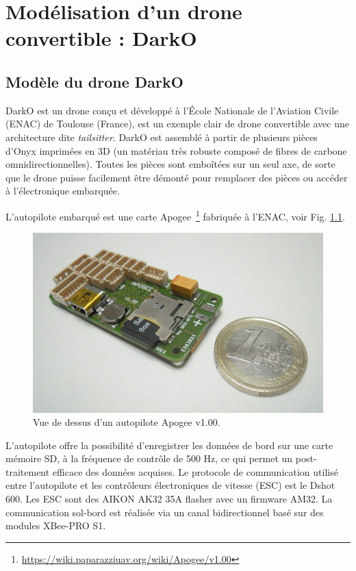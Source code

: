 \chapter{Modélisation d'un drone convertible : DarkO}
\minitoc
\label{chap:model}

\section{Modèle du drone DarkO}
\label{sec:model}
DarkO est un drone conçu et développé à l'École Nationale de l'Aviation Civile (ENAC) de Toulouse (France), est un exemple clair de drone convertible avec une architecture dite \textit{tailsitter}.
DarkO est assemblé à partir de plusieurs pièces d'Onyx imprimées en 3D (un matériau très robuste composé de fibres de carbone omnidirectionnelles). Toutes les pièces sont emboîtées sur un seul axe, de sorte que le drone puisse facilement être démonté pour remplacer des pièces ou accéder à l'électronique embarquée. 

L'autopilote embarqué est une carte Apogee~\footnote{\url{https://wiki.paparazziuav.org/wiki/Apogee/v1.00}} fabriquée à l'ENAC, voir Fig. \ref{fig:apogee}. 


\begin{figure}[ht]
    \centering
        \includegraphics[width=0.8\columnwidth]{figures/800px-Apogee_v100_top_1E.jpeg}
        \caption{Vue de dessus d'un autopilote Apogee v1.00.}
        \label{fig:apogee}
\end{figure}

L'autopilote offre la possibilité d'enregistrer les données de bord sur une carte mémoire SD, à la fréquence de contrôle de 500 Hz, ce qui permet un post-traitement efficace des données acquises. Le protocole de communication utilisé entre l'autopilote et les contrôleurs électroniques de vitesse (ESC) est le Dshot 600. Les ESC sont des AIKON AK32 35A  flasher avec un firmware AM32. La communication sol-bord est réalisée via un canal bidirectionnel basé sur des modules XBee-PRO S1.

